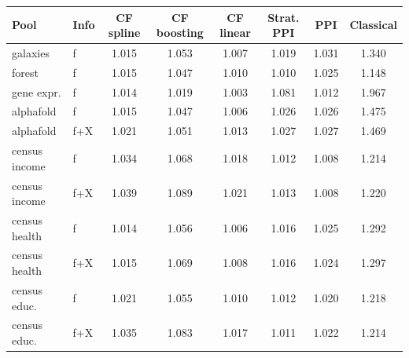 \begin{tabular}{llcccccc}
\toprule
Pool & Info & CF spline & CF boosting & CF linear & Strat. PPI & PPI & Classical \\
\midrule
galaxies & f & 1.015 & 1.053 & 1.007 & 1.019 & 1.031 & 1.340 \\
forest & f & 1.015 & 1.047 & 1.010 & 1.010 & 1.025 & 1.148 \\
gene expr. & f & 1.014 & 1.019 & 1.003 & 1.081 & 1.012 & 1.967 \\
alphafold & f & 1.015 & 1.047 & 1.006 & 1.026 & 1.026 & 1.475 \\
alphafold & f+X & 1.021 & 1.051 & 1.013 & 1.027 & 1.027 & 1.469 \\
census income & f & 1.034 & 1.068 & 1.018 & 1.012 & 1.008 & 1.214 \\
census income & f+X & 1.039 & 1.089 & 1.021 & 1.013 & 1.008 & 1.220 \\
census health & f & 1.014 & 1.056 & 1.006 & 1.016 & 1.025 & 1.292 \\
census health & f+X & 1.015 & 1.069 & 1.008 & 1.016 & 1.024 & 1.297 \\
census educ. & f & 1.021 & 1.055 & 1.010 & 1.012 & 1.020 & 1.218 \\
census educ. & f+X & 1.035 & 1.083 & 1.017 & 1.011 & 1.022 & 1.214 \\
\bottomrule
\end{tabular}
